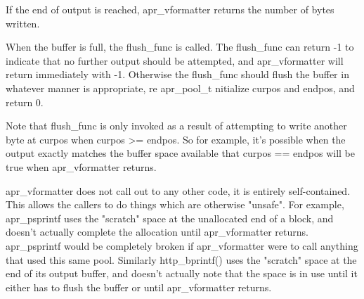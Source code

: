 \begin{DoxyPre}If the end of output is reached, apr\_vformatter returns the
number of bytes written.\end{DoxyPre}



\begin{DoxyPre}When the buffer is full, the flush\_func is called.  The flush\_func
can return -1 to indicate that no further output should be attempted,
and apr\_vformatter will return immediately with -1.  Otherwise
the flush\_func should flush the buffer in whatever manner is
appropriate, re apr\_pool\_t nitialize curpos and endpos, and return 0.\end{DoxyPre}



\begin{DoxyPre}Note that flush\_func is only invoked as a result of attempting to
write another byte at curpos when curpos >= endpos.  So for
example, it's possible when the output exactly matches the buffer
space available that curpos == endpos will be true when
apr\_vformatter returns.\end{DoxyPre}



\begin{DoxyPre}apr\_vformatter does not call out to any other code, it is entirely
self-contained.  This allows the callers to do things which are
otherwise "unsafe".  For example, apr\_psprintf uses the "scratch"
space at the unallocated end of a block, and doesn't actually
complete the allocation until apr\_vformatter returns.  apr\_psprintf
would be completely broken if apr\_vformatter were to call anything
that used this same pool.  Similarly http\_bprintf() uses the "scratch"
space at the end of its output buffer, and doesn't actually note
that the space is in use until it either has to flush the buffer
or until apr\_vformatter returns.
\end{DoxyPre}


